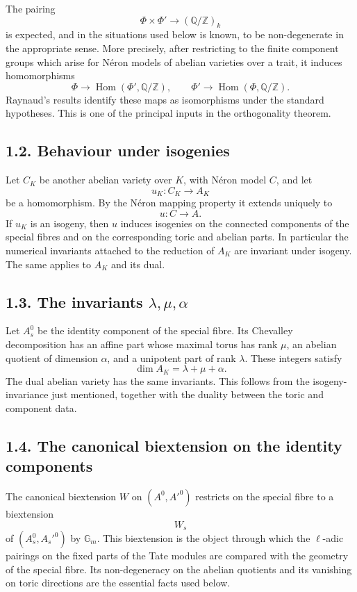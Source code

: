 \documentclass[11pt]{article}
\newcommand{\bZ}{\mathbb Z}
\newcommand{\bQ}{\mathbb Q}
\newcommand{\Gm}{\mathbb G_m}
\newcommand{\Hom}{\operatorname{Hom}}
\begin{document}
The pairing
\[
\Phi\times\Phi'\to(\bQ/\bZ)_k
\]
is expected, and in the situations used below is known, to be non-degenerate in
the appropriate sense. More precisely, after restricting to the finite component
groups which arise for Néron models of abelian varieties over a trait, it induces
homomorphisms
\[
\Phi\longrightarrow \Hom(\Phi',\bQ/\bZ),\qquad
\Phi'\longrightarrow \Hom(\Phi,\bQ/\bZ).
\]
Raynaud's results identify these maps as isomorphisms under the standard
hypotheses. This is one of the principal inputs in the orthogonality theorem.

\subsection*{1.2. Behaviour under isogenies}

Let \(C_K\) be another abelian variety over \(K\), with Néron model \(C\), and
let
\[
u_K:C_K\to A_K
\]
be a homomorphism. By the Néron mapping property it extends uniquely to
\[
u:C\to A.
\]
If \(u_K\) is an isogeny, then \(u\) induces isogenies on the connected
components of the special fibres and on the corresponding toric and abelian
parts. In particular the numerical invariants attached to the reduction of
\(A_K\) are invariant under isogeny. The same applies to \(A_K\) and its dual.

\subsection*{1.3. The invariants \(\lambda,\mu,\alpha\)}

Let \(A_s^0\) be the identity component of the special fibre. Its Chevalley
decomposition has an affine part whose maximal torus has rank \(\mu\), an
abelian quotient of dimension \(\alpha\), and a unipotent part of rank
\(\lambda\). These integers satisfy
\[
\dim A_K=\lambda+\mu+\alpha.
\]
The dual abelian variety has the same invariants. This follows from the
isogeny-invariance just mentioned, together with the duality between the toric
and component data.

\subsection*{1.4. The canonical biextension on the identity components}

The canonical biextension \(W\) on \((A^0,A'^0)\) restricts on the special fibre
to a biextension
\[
W_s
\]
of \((A_s^0,A_s'^0)\) by \(\Gm\). This biextension is the object through which
the \(\ell\)-adic pairings on the fixed parts of the Tate modules are compared
with the geometry of the special fibre. Its non-degeneracy on the abelian
quotients and its vanishing on toric directions are the essential facts used
below.
\end{document}
